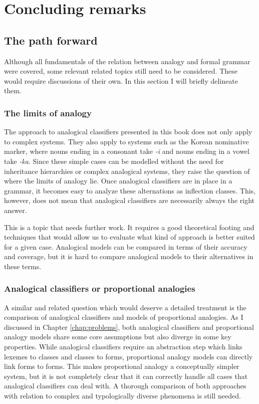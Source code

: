 \chapter{Concluding remarks}\label{chap:conclusion}

\section{The path forward}

Although all fundamentals of the relation between analogy and formal grammar were covered, some relevant related topics still need to be considered. These would require discussions of their own. In this section I will briefly delineate them.

\subsection{The limits of analogy}

The approach to analogical classifiers presented in this book does not only apply to complex systems.
They also apply to systems such as the Korean nominative marker, where nouns ending in a consonant take \textit{-i} and nouns ending in a vowel take \textit{-ka}.
Since these simple cases can be modelled without the need for inheritance hierarchies or complex analogical systems, they raise the question of where the limits of analogy lie.
Once analogical classifiers are in place in a grammar, it becomes easy to analyze these alternations as inflection classes.
This, however, does not mean that analogical classifiers are necessarily always the right answer.

This is a topic that needs further work.
It requires a good theoretical footing and techniques that would allow us to evaluate what kind of approach is better suited for a given case.
Analogical models can be compared in terms of their accuracy and coverage, but it is hard to compare analogical models to their alternatives in these terms.

\subsection{Analogical classifiers or proportional analogies}

A similar and related question which would deserve a detailed treatment is the comparison of analogical classifiers and models of proportional analogies.
As I discussed in Chapter \ref{chap:problems}, both analogical classifiers and proportional analogy models share some core assumptions but also diverge in some key properties. While analogical classifiers require an abstraction step which links lexemes to classes and classes to forms, proportional analogy models can directly link forms to forms. This makes proportional analogy a conceptually simpler system, but it is not completely clear that it can correctly handle all cases that analogical classifiers can deal with. A thorough comparison of both approaches with relation to complex and typologically diverse phenomena is still needed.

